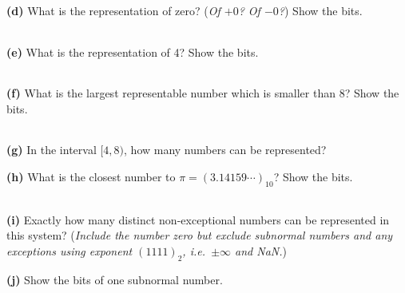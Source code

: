 \documentclass[12pt]{amsart}
\newcommand{\epart}[1]{\bigskip\noindent\textbf{(#1)}\quad }
\newcommand{\bitboxes}{
\large
\begin{center}
\begin{tabular}{|c|c|c|c|c|c|c|c|c|c|c|c|} \hline
\phantom{$e_1$} &
\phantom{$e_1$} &
\phantom{$e_1$} &
\phantom{$e_1$} &
\phantom{$e_1$} &
\phantom{$e_1$} &
\phantom{$e_1$} &
\phantom{$e_1$} &
\phantom{$e_1$} &
\phantom{$e_1$} &
\phantom{$e_1$} &
\phantom{$e_1$} \\ \hline
\end{tabular}
\end{center}
\normalsize}
\begin{document}
\epart{d}  What is the representation of zero?  (\emph{Of $+0$? Of $-0$?})  Show the bits.

\bitboxes
\vfill

\newpage
\epart{e}  What is the representation of 4?  Show the bits.

\bitboxes
\vfill

\epart{f}  What is the largest representable number which is smaller than 8?  Show the bits.

\bitboxes
\vfill

\epart{g}  In the interval $[4,8)$, how many numbers can be represented?
\vfill

\epart{h}  What is the closest number to $\pi=(3.14159\cdots)_{10}$?  Show the bits.

\bitboxes
\vfill

\epart{i}  Exactly how many distinct non-exceptional numbers can be represented in this system?  (\emph{Include the number zero but exclude subnormal numbers and any exceptions using exponent $(1111)_2$, i.e.~$\pm\infty$ and NaN.})
\vfill

\epart{j}  Show the bits of one subnormal number.

\bitboxes
\vspace{0.6in}
\end{document}
